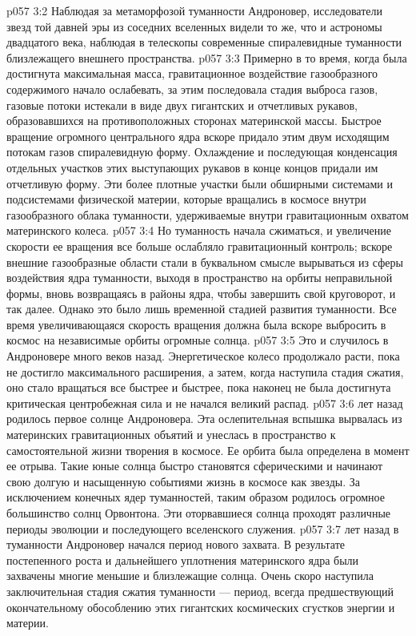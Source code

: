 \vs p057 3:2 Наблюдая за метаморфозой туманности Андроновер, исследователи звезд той давней эры из соседних вселенных видели то же, что и астрономы двадцатого века, наблюдая в телескопы современные спиралевидные туманности близлежащего внешнего пространства.
\vs p057 3:3 Примерно в то время, когда была достигнута максимальная масса, гравитационное воздействие газообразного содержимого начало ослабевать, за этим последовала стадия выброса газов, газовые потоки истекали в виде двух гигантских и отчетливых рукавов, образовавшихся на противоположных сторонах материнской массы. Быстрое вращение огромного центрального ядра вскоре придало этим двум исходящим потокам газов спиралевидную форму. Охлаждение и последующая конденсация отдельных участков этих выступающих рукавов в конце концов придали им отчетливую форму. Эти более плотные участки были обширными системами и подсистемами физической материи, которые вращались в космосе внутри газообразного облака туманности, удерживаемые внутри гравитационным охватом материнского колеса.
\vs p057 3:4 Но туманность начала сжиматься, и увеличение скорости ее вращения все больше ослабляло гравитационный контроль; вскоре внешние газообразные области стали в буквальном смысле вырываться из сферы воздействия ядра туманности, выходя в пространство на орбиты неправильной формы, вновь возвращаясь в районы ядра, чтобы завершить свой круговорот, и так далее. Однако это было лишь временной стадией развития туманности. Все время увеличивающаяся скорость вращения должна была вскоре выбросить в космос на независимые орбиты огромные солнца.
\vs p057 3:5 Это и случилось в Андроновере много веков назад. Энергетическое колесо продолжало расти, пока не достигло максимального расширения, а затем, когда наступила стадия сжатия, оно стало вращаться все быстрее и быстрее, пока наконец не была достигнута критическая центробежная сила и не начался великий распад.
\vs p057 3:6 \pc {} лет назад родилось первое солнце Андроновера. Эта ослепительная вспышка вырвалась из материнских гравитационных объятий и унеслась в пространство к самостоятельной жизни творения в космосе. Ее орбита была определена в момент ее отрыва. Такие юные солнца быстро становятся сферическими и начинают свою долгую и насыщенную событиями жизнь в космосе как звезды. За исключением конечных ядер туманностей, таким образом родилось огромное большинство солнц Орвонтона. Эти оторвавшиеся солнца проходят различные периоды эволюции и последующего вселенского служения.
\vs p057 3:7 \pc {} лет назад в туманности Андроновер начался период нового захвата. В результате постепенного роста и дальнейшего уплотнения материнского ядра были захвачены многие меньшие и близлежащие солнца. Очень скоро наступила заключительная стадия сжатия туманности --- период, всегда предшествующий окончательному обособлению этих гигантских космических сгустков энергии и материи.
